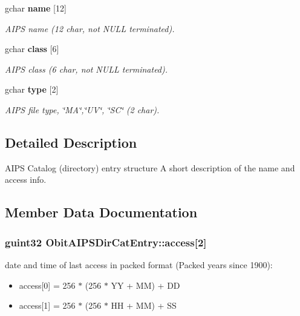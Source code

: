 \begin{CompactItemize}
gchar {\bf name} [12]
\begin{CompactList}\small\item\em AIPS name (12 char, not NULL terminated). \item\end{CompactList}\item 
gchar {\bf class} [6]
\begin{CompactList}\small\item\em AIPS class (6 char, not NULL terminated). \item\end{CompactList}\item 
gchar {\bf type} [2]
\begin{CompactList}\small\item\em AIPS file type, \char`\"{}MA\char`\"{},\char`\"{}UV\char`\"{}, \char`\"{}SC\char`\"{} (2 char). \item\end{CompactList}\end{CompactItemize}


\subsection{Detailed Description}
AIPS Catalog (directory) entry structure A short description of the name and access info. 



\subsection{Member Data Documentation}
\subsubsection{\setlength{\rightskip}{0pt plus 5cm}guint32 {\bf Obit\-AIPSDir\-Cat\-Entry::access}[2]}\label{structObitAIPSDirCatEntry_o2}


date and time of last access in packed format (Packed years since 1900): \begin{itemize}
\item access[0] = 256 $\ast$ (256 $\ast$ YY + MM) + DD \item access[1] = 256 $\ast$ (256 $\ast$ HH + MM) + SS \end{itemize}


